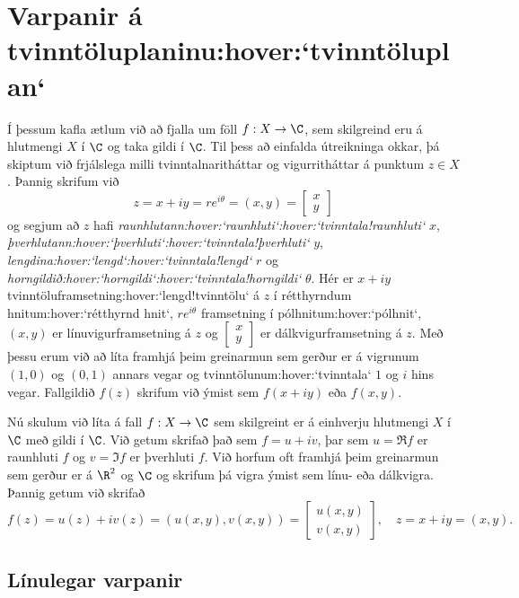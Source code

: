 \section{Varpanir á tvinntöluplaninu:hover:`tvinntöluplan`}

\noindent
Í þessum kafla ætlum við að fjalla um föll $f:X\to \C$, sem skilgreind
eru á hlutmengi $X$ í $\C$ og taka gildi í $\C$.  Til þess að einfalda
útreikninga okkar, þá skiptum við frjálslega milli tvinntalnaritháttar og
vigurritháttar á punktum $z\in X$.  Þannig skrifum við
$$
z=x+iy=re^{i{\theta}}=(x,y)=\left[\begin{matrix} x\\ y\end{matrix}\right]
$$ 
og segjum að $z$ hafi {\it
raunhlutann:hover:`raunhluti`:hover:`tvinntala!raunhluti`} $x$, {\it
þverhlutann:hover:`þverhluti`:hover:`tvinntala!þverhluti`} $y$,
{\it lengdina:hover:`lengd`:hover:`tvinntala!lengd`} $r$ og {\it
horngildið:hover:`horngildi`:hover:`tvinntala!horngildi`}
${\theta}$.  Hér er $x+iy$ tvinntöluframsetning:hover:`lengd!tvinntölu`
á  $z$ í rétthyrndum hnitum:hover:`rétthyrnd hnit`, $re^{i{\theta}}$
framsetning í pólhnitum:hover:`pólhnit`, $(x,y)$ er
línu\-vigur\-fram\-setning á $z$  og $\left[\begin{matrix} x\\
y\end{matrix}\right]$ er dálk\-vigur\-fram\-setning á $z$. Með þessu
erum við að líta framhjá þeim greinarmun sem gerður er á 
vigrunum $(1,0)$ og $(0,1)$ annars vegar og
tvinntölunum:hover:`tvinntala`  
$1$ og $i$ hins vegar.
Fallgildið $f(z)$ skrifum við ýmist sem $f(x+iy)$ eða $f(x,y)$.


Nú skulum við líta á fall $f:X\to \C$ sem skilgreint er á einhverju
hlutmengi $X$ í $\C$ með gildi í $\C$.  Við getum skrifað það sem
$f=u+iv$, þar sem $u=\Re f$ er raunhluti $f$ og $v=\Im f$ er þverhluti
$f$. Við horfum oft framhjá þeim greinarmun sem gerður er á $\R^2$ og
$\C$ og skrifum þá vigra ýmist sem línu- eða dálkvigra.  Þannig getum
við skrifað
$$
f(z)=u(z)+iv(z)=(u(x,y), v(x,y))=
\left[\begin{matrix} u(x,y) \\ v(x,y)\end{matrix}\right], \quad
z=x+iy=(x,y).
$$


\subsection*{Línulegar varpanir}

